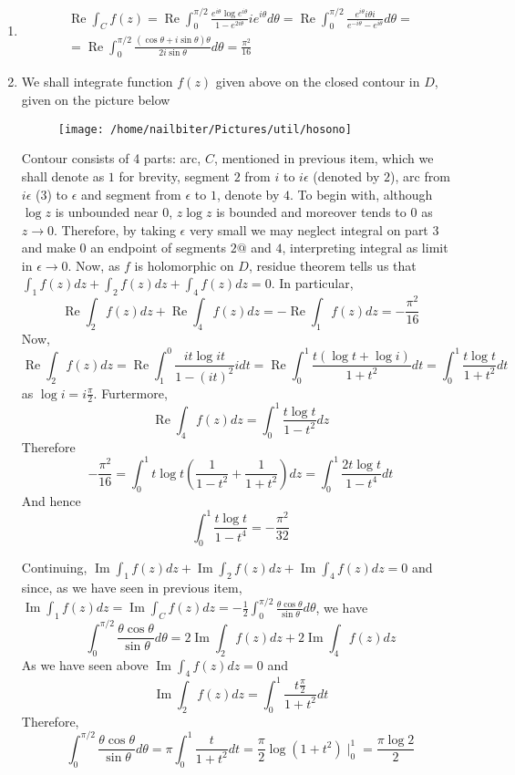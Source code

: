 \documentclass[8pt]{article} %
\renewcommand\Re{\operatorname{Re}}
\renewcommand\Im{\operatorname{Im}}
\newcommand{\myexponent}[1]{e^{#1 i\theta}}
\begin{document}
\begin{enumerate}[label=(\arabic*)]
\item{\begin{gather*}
\Re\int_C f(z)=\Re \int_0^{\pi/2} \frac{e^{i\theta}\log e^{i\theta}}{1-e^{2i\theta}}ie^{i\theta}d\theta=
\Re\int_0^{\pi/2}\frac{\myexponent{}i\theta i}{\myexponent{-}-\myexponent{}}d\theta=\\
=\Re\int_0^{\pi/2}\frac{(\cos\theta+i\sin\theta)\theta}{2i\sin\theta}d\theta=\frac{\pi^2}{16}
\end{gather*}
}
\item{
We shall integrate function $f(z)$ given above on the closed contour in $D$, given on the picture below
\begin{figure}[H]
\centering
\texttt{[image: /home/nailbiter/Pictures/util/hosono]}
\end{figure}
}
Contour consists of 4 parts: arc, $C$, mentioned in previous item, which we shall denote as $1$ for brevity, segment $2$ from $i$ to $i\epsilon$
(denoted by $2$), arc from $i\epsilon$ ($3$) to $\epsilon$ and segment from $\epsilon$ to $1$, denote by $4$. To begin with, although $\log z$
is unbounded near $0$, $z\log z$ is bounded and moreover tends to $0$ as $z\to 0$. Therefore, by taking $\epsilon$ very small we may neglect
integral on part $3$ and make $0$ an endpoint of segments $2@$ and $4$, interpreting integral as limit in $\epsilon\to0$. Now, as $f$ is 
holomorphic on $D$, residue theorem tells us that $\int_1 f(z)dz+\int_2f(z)dz+\int_4f(z)dz=0$. In particular,
\[\Re\int_2f(z)dz+\Re\int_4f(z)dz=-\Re\int_1f(z)dz=-\frac{\pi^2}{16}\]
Now,
\[\Re\int_2f(z)dz=\Re\int_1^0 \frac{it\log it}{1-(it)^2}idt=\Re\int_0^1\frac{t(\log t+\log i)}{1+t^2}dt=\int_0^1\frac{t\log t}{1+t^2}dt\]
as $\log i=i\frac{\pi}{2}$. Furtermore,
\[\Re\int_4f(z)dz=\int_0^1\frac{t\log t}{1-t^2}dz\]
Therefore
\[-\frac{\pi^2}{16}=\int_0^1t\log t \left(\frac{1}{1-t^2}+\frac{1}{1+t^2}\right)dz=\int_0^1 \frac{2t\log t}{1-t^4}dt\]
And hence
\[\int_0^1\frac{t\log t}{1-t^4}=-\frac{\pi^2}{32}\]

Continuing, $\Im\int_1 f(z)dz+\Im\int_2f(z)dz+\Im\int_4f(z)dz=0$ and since, as we have seen in previous item, $\Im\int_1f(z)dz=
\Im\int_Cf(z)dz=-\frac{1}{2}\int_0^{\pi/2}\frac{\theta\cos\theta}{\sin\theta}d\theta$, we have
\[\int_0^{\pi/2}\frac{\theta\cos\theta}{\sin\theta}d\theta=2\Im\int_2f(z)dz+2\Im\int_4f(z)dz\]
As we have seen above $\Im\int_4f(z)dz=0$ and
\[\Im\int_2f(z)dz=\int_0^1\frac{t\frac{\pi}{2}}{1+t^2}dt\]
Therefore,
\[\int_0^{\pi/2}\frac{\theta\cos\theta}{\sin\theta}d\theta=\pi\int_0^1\frac{t}{1+t^2}dt=\frac{\pi}{2}\log(1+t^2)\mid_0^{1}=\frac{\pi\log2}{2}\]
\end{enumerate}
\end{document}
